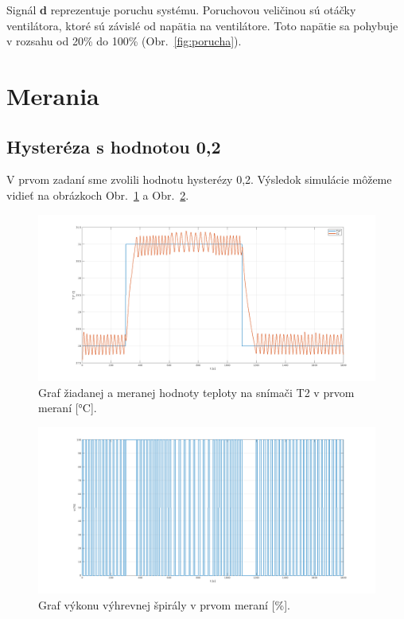 \documentclass{article}
\begin{document}
Signál \textbf{d} reprezentuje poruchu systému. Poruchovou veličinou sú otáčky ventilátora, ktoré sú závislé
od napätia na ventilátore. Toto napätie sa pohybuje v rozsahu od 20\% do 100\% (Obr.~\ref{fig:porucha}).

\section{Merania}
\label{sec:merania}

\subsection{Hysteréza s hodnotou 0,2}
\label{sec:meranie1}

V prvom zadaní sme zvolili hodnotu hysterézy 0,2. Výsledok simulácie môžeme vidieť na obrázkoch
Obr.~\ref{fig:m1t2} a Obr.~\ref{fig:m1u}.

\begin{figure}[!htbp]
	\begin{center}
		\includegraphics[width=\textwidth]{./include/m1T2.png}
	\end{center}
	\caption{Graf žiadanej a meranej hodnoty teploty na snímači T2 v prvom meraní [°C].}
	\label{fig:m1t2}
\end{figure}

\clearpage

\begin{figure}[!htbp]
	\begin{center}
		\includegraphics[width=\textwidth]{./include/m1u.png}
	\end{center}
	\caption{Graf výkonu výhrevnej špirály v prvom meraní [\%].}
	\label{fig:m1u}
\end{figure}
\end{document}
